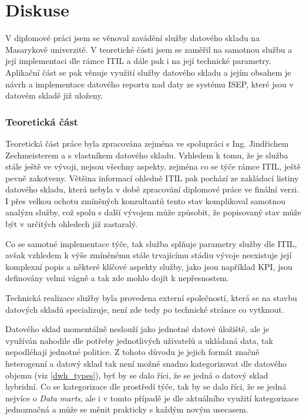 \documentclass[
  digital,     %
  twoside,     %
  lof,         %
  lot,         %
]{fithesis4}
\begin{document}
\chapter{Diskuse}
V diplomové práci jsem se věnoval zavádění služby datového skladu na Masarykově univerzitě. V teoretické části jsem se zaměřil na samotnou službu a její implementaci dle rámce ITIL a dále pak i na její technické parametry. Aplikační část se pak věnuje využití služby datového skladu a jejím obsahem je návrh a implementace datového reportu nad daty ze systému ISEP, které jsou v datovém skladě již uloženy. 

\subsection{Teoretická část}
Teoretická část práce byla zpracována zejména ve spolupráci s Ing. Jindřichem Zechmeisterem a s vlastníkem datového skladu. Vzhledem k tomu, že je služba stále ještě ve vývoji, nejsou všechny aspekty, zejména co se týče rámce ITIL, ještě pevně zakotveny. Většina informací ohledně ITIL pak pochází ze zakládací listiny datového skladu, která nebyla v době zpracování diplomové práce ve finální verzi. I přes velkou ochotu zmíněných konzultantů tento stav komplikoval samotnou analýzu služby, což spolu s další vývojem může způsobit, že popisovaný stav může být v určitých ohledech již zastaralý. 

Co se samotné implementace týče, tak služba splňuje parametry služby dle ITIL, avšak vzhledem k výše zmíněnému stále trvajícímu stádiu vývoje neexistuje její komplexní popis a některé klíčové aspekty služby, jako jsou například KPI, jsou definovány velmi vágně a tak zde mohlo dojít k nepřesnostem. 

Technická realizace služby byla provedena externí společností, která se na stavbu datových skladů specializuje, není zde tedy po technické stránce co vytknout. 

Datového sklad momentálně neslouží jako jednotné datové úložiště, ale je využíván nahodile dle potřeby jednotlivých uživatelů a ukládaná data, tak nepodléhají jednotné politice. Z tohoto důvodu  je jejich formát značně heterogenní a datový sklad tak není možné snadno kategorizovat dle datového objemu (viz \ref{dwh_types}), byť by se dalo říci, že se jedná o datový sklad hybridní. Co se kategorizace dle prostředí týče, tak by se dalo říci, že se jedná nejvíce o \emph{Data marts}, ale i v tomto případě je dle aktuálního využití kategorizace jednoznačná a může se měnit prakticky s každým novým usecasem. 
\end{document}
